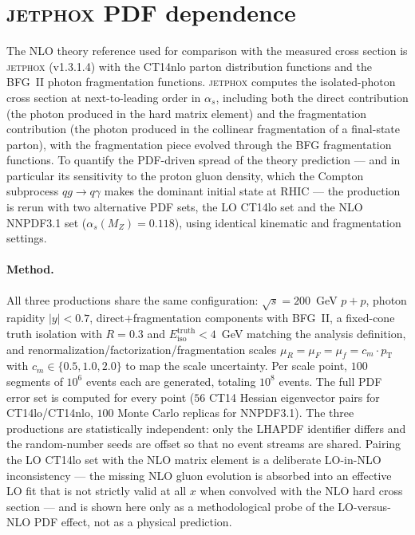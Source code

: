 \documentclass[11pt]{article}
\newcommand{\Eiso}{E_{\mathrm{iso}}}
\newcommand{\sqrts}{\sqrt{s}}
\begin{document}
\section{\textsc{jetphox} PDF dependence}
\label{app:jetphox}
The NLO theory reference used for comparison with the measured cross section is
\textsc{jetphox} (v1.3.1.4) with the CT14nlo parton distribution functions and
the BFG~II photon fragmentation functions. \textsc{jetphox} computes the
isolated-photon cross section at next-to-leading order in $\alpha_s$, including
both the direct contribution (the photon produced in the hard matrix element) and
the fragmentation contribution (the photon produced in the collinear
fragmentation of a final-state parton), with the fragmentation piece evolved
through the BFG fragmentation functions. To quantify the PDF-driven spread of the
theory prediction --- and in particular its sensitivity to the proton gluon
density, which the Compton subprocess $qg\to q\gamma$ makes the dominant initial
state at RHIC --- the production is rerun with two alternative PDF sets, the LO
CT14lo set and the NLO NNPDF3.1 set ($\alpha_s(M_Z)=0.118$), using identical
kinematic and fragmentation settings.

\paragraph{Method.} All three productions share the same configuration:
$\sqrts=200$~GeV $p+p$, photon rapidity $|y|<0.7$, direct$+$fragmentation
components with BFG~II, a fixed-cone truth isolation with $R=0.3$ and
$\Eiso^{\mathrm{truth}}<4$~GeV matching the analysis definition, and
renormalization/factorization/fragmentation scales
$\mu_R=\mu_F=\mu_f=c_m\cdot p_{\mathrm{T}}$ with $c_m\in\{0.5,1.0,2.0\}$ to map the
scale uncertainty. Per scale point, $100$ segments of $10^6$ events each are
generated, totaling $10^8$ events. The full PDF error set is computed for every
point ($56$ CT14 Hessian eigenvector pairs for CT14lo/CT14nlo, $100$ Monte Carlo
replicas for NNPDF3.1). The three productions are statistically independent: only
the LHAPDF identifier differs and the random-number seeds are offset so that no
event streams are shared. Pairing the LO CT14lo set with the NLO matrix element is
a deliberate LO-in-NLO inconsistency --- the missing NLO gluon evolution is
absorbed into an effective LO fit that is not strictly valid at all $x$ when
convolved with the NLO hard cross section --- and is shown here only as a
methodological probe of the LO-versus-NLO PDF effect, not as a physical
prediction.
\end{document}
